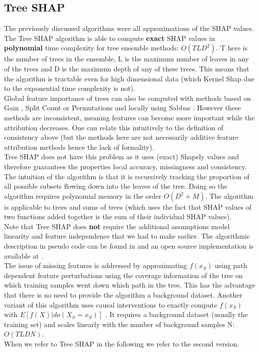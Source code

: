 \documentclass[conference]{IEEEtran}
\begin{document}
\subsection{Tree SHAP}
The previously discussed algorithms were all approximations of the SHAP values. The Tree SHAP \cite{b1} algorithm is able to compute \textbf{exact} SHAP values in \textbf{polynomial} time complexity for tree ensemble methods: $O(TLD^2)$. 
T here is the number of trees in the ensemble, L is the maximum number of leaves in any of the trees and D is the maximum depth of any of these trees. 
This means that the algorithm is tractable even for high dimensional data (which Kernel Shap due to the exponential time complexity is not).\\
Global feature importance of trees can also be computed with methods based on Gain \cite{b9}, Split Count \cite{b10} or Permutations \cite{b11} and locally using Sabbas \cite{b12}.
However these methods are inconsistent, meaning features can become more important while the attribution decreases. One can relate this intuitively to the definition of consistency above (but the methods here are not necessarily additive feature attribution methods hence the lack of formality).\\
Tree SHAP does not have this problem as it uses (exact) Shapely values and therefore guarantees the properties local accuracy, missingness and consistency. 
The intuition of the algorithm is that it is recursively tracking the proportion of all possible subsets flowing down into the leaves of the tree. 
Doing so the algorithm requires polynomial memory in the order $O(D^2 + M)$.
The algorithm is applicable to trees and sums of trees (which uses the fact that SHAP values of two functions added together is the sum of their individual SHAP values).\\
Note that Tree SHAP does \textbf{not} require the additional assumptions model linearity and feature independence that we had to make earlier. The algorithmic description in pseudo code can be found in \cite{b1} and an open source implementation is available at \cite{b13}.\\
The issue of missing features is addressed by approximating $f(x_S)$ using path dependent feature perturbations using the coverage information of the tree on which training samples went down which path in the tree.
This has the advantage that there is no need to provide the algorithm a background dataset.
Another variant of this algorithm uses causal interventions to exactly compute $f(x_S)$ with $E[f(X)|do(X_S = x_S)]$ \cite{b19}. 
It requires a background dataset (usually the training set) and scales linearly with the number of background samples N: $O(TLDN)$.\\
When we refer to Tree SHAP in the following we refer to the second version.\\
\end{document}

